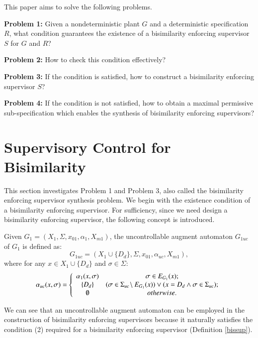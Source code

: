 \documentclass[preprint,authoryear,12pt]{elsarticle}
\begin{document}
This paper aims to solve the following problems.

{\bf Problem 1:} Given a nondeterministic plant $G$ and a
deterministic specification $R$, what condition guarantees the
existence of a bisimilarity enforcing supervisor $S$ for $G$ and
$R$?

{\bf Problem 2:} How to check this condition effectively?

{\bf Problem 3:} If the condition is satisfied, how to construct a
bisimilarity enforcing supervisor $S$?

{\bf Problem 4:} If the condition is not satisfied, how to obtain
a maximal permissive sub-specification which enables the synthesis
of bisimilarity enforcing supervisors?






\section{ Supervisory Control for Bisimilarity}





This section investigates Problem 1 and Problem 3, also called the
bisimilarity enforcing supervisor synthesis problem. We begin with
the existence condition of a bisimilarity enforcing supervisor.
For sufficiency, since we need design a bisimilarity enforcing
supervisor, the following concept is introduced.

\begin{Definition}
Given $G_1 =(X_1,\Sigma,x_{01},\alpha_1, X_{m1})$, the
uncontrollable augment automaton $G_{1uc}$ of $G_1$ is defined as:
\[
G_{1uc} =(X_1 \cup \{D_d \},\Sigma,x_{01},\alpha_{uc},X_{m1}),
\]
where for any $x \in X_1 \cup \{D_d \}$ and $\sigma \in \Sigma$:
\[
  \alpha_{uc}(x,\sigma) = \left\{ {\begin{array}{*{20}c}
   \alpha_1(x, \sigma) & \sigma \in E_{G_1}(x);  \\
   \{D_d\} & { (\sigma \in \Sigma_{uc} \!\setminus E_{G_1}(x)) \vee (x=D_d \wedge \sigma \in \Sigma_{uc})} ;  \\
   \emptyset & {otherwise.}\\
\end{array}} \right.
\]
\end{Definition}

We can see that an uncontrollable augment automaton can be
employed in the construction of bisimilarity enforcing supervisors
because it naturally satisfies the condition (2) required for a
bisimilarity enforcing supervisor (Definition \ref{bissup}).
\end{document}
